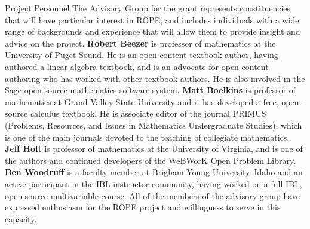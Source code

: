 \documentclass[11pt]{article}
\begin{document}
\begin{section}{Project Personnel}
The Advisory Group for the grant represents constituencies that will have
particular interest in ROPE, and includes individuals with a wide range of
backgrounds and experience that will allow them to provide insight and
advice on the project.  \textbf{Robert Beezer} is professor of mathematics
at the University of Puget Sound.  He is an open-content textbook author,
having authored a linear algebra textbook, and is an advocate for
open-content authoring who has worked with other textbook authors.  He is
also involved in the Sage open-source mathematics software system.
\textbf{Matt Boelkins} is professor of mathematics at Grand Valley State
University and is has developed a free, open-source calculus textbook.  He is
associate editor of the journal PRIMUS (Problems, Resources, and Issues
in Mathematics Undergraduate Studies), which is one of the main journals
devoted to the teaching of collegiate mathematics.  
\textbf{Jeff Holt} is professor of mathematics at the University of
Virginia, and is one of the authors and continued developers of the
WeBWorK Open Problem Library.
\textbf{Ben Woodruff} is a faculty member at Brigham Young
University--Idaho and an active participant in the IBL instructor
community, having worked on a full IBL, open-source multivariable course.
All of the members of the advisory group have expressed enthusiasm for the
ROPE project and willingness to serve in this capacity.  


\end{section}
\end{document}
